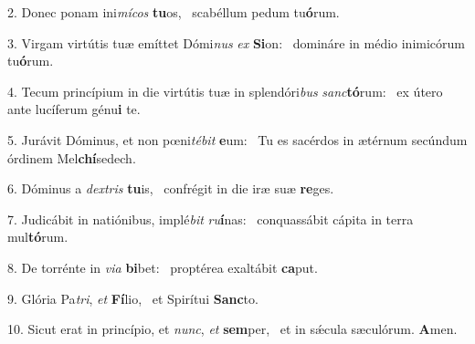 2. Donec ponam ini\textit{mí}\textit{cos} \textbf{tu}os, \ast\  scabéllum pedum tu\textbf{ó}rum.\

3. Virgam virtútis tuæ emíttet Dómi\textit{nus} \textit{ex} \textbf{Si}on: \ast\  domináre in médio inimicórum tu\textbf{ó}rum.\

4. Tecum princípium in die virtútis tuæ in splendóri\textit{bus} \textit{sanc}\textbf{tó}rum: \ast\  ex útero ante lucíferum génu\textbf{i} te.\

5. Jurávit Dóminus, et non pœni\textit{té}\textit{bit} \textbf{e}um: \ast\  Tu es sacérdos in ætérnum secúndum órdinem Mel\textbf{chí}sedech.\

6. Dóminus a \textit{dex}\textit{tris} \textbf{tu}is, \ast\  confrégit in die iræ suæ \textbf{re}ges.\

7. Judicábit in natiónibus, implé\textit{bit} \textit{ru}\textbf{í}nas: \ast\  conquassábit cápita in terra mul\textbf{tó}rum.\

8. De torrénte in \textit{vi}\textit{a} \textbf{bi}bet: \ast\  proptérea exaltábit \textbf{ca}put.\

9. Glória Pa\textit{tri}, \textit{et} \textbf{Fí}lio, \ast\  et Spirítui \textbf{Sanc}to.\

10. Sicut erat in princípio, et \textit{nunc}, \textit{et} \textbf{sem}per, \ast\  et in sǽcula sæculórum. \textbf{A}men.\


